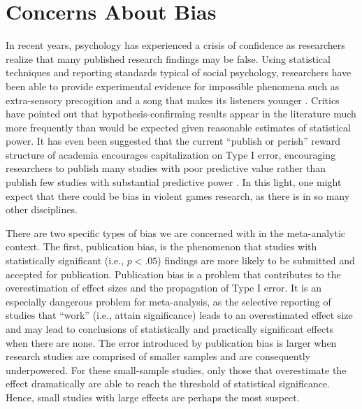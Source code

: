 \documentclass[man]{apa6}
\begin{document}
\section{Concerns About Bias}
In recent years, psychology has experienced a crisis of confidence as researchers realize that many published research findings may be false. Using statistical techniques and reporting standards typical of social psychology, researchers have been able to provide experimental evidence for impossible phenomena such as extra-sensory precogition \citep[psi;][]{Bem:2011} and a song that makes its listeners younger \citep{Simmons:etal:2011}. Critics have pointed out that hypothesis-confirming results appear in the literature much more frequently than would be expected given reasonable estimates of statistical power. %
It has even been suggested that the current ``publish or perish'' reward structure of academia encourages capitalization on Type I error, encouraging researchers to publish many studies with poor predictive value rather than publish few studies with substantial predictive power \citep{Bakker:etal:2011}. In this light, one might expect that there could be bias in violent games research, as there is in so many other disciplines. 

There are two specific types of bias we are concerned with in the meta-analytic context. The first, publication bias, is the phenomenon that studies with statistically significant (i.e., $p<.05$) findings are more likely to be submitted and accepted for publication. Publication bias is a problem that contributes to the overestimation of effect sizes and the propagation of Type I error. It is an especially dangerous problem for meta-analysis, as the selective reporting of studies that ``work'' (i.e., attain significance) leads to an overestimated effect size and may lead to conclusions of statistically and practically significant effects when there are none. The error introduced by publication bias is larger when research studies are comprised of smaller samples and are consequently underpowered.  For these small-sample studies, only those that overestimate the effect dramatically are able to reach the threshold of statistical significance.    Hence, small studies with large effects are perhaps the most suspect.  
\end{document}
